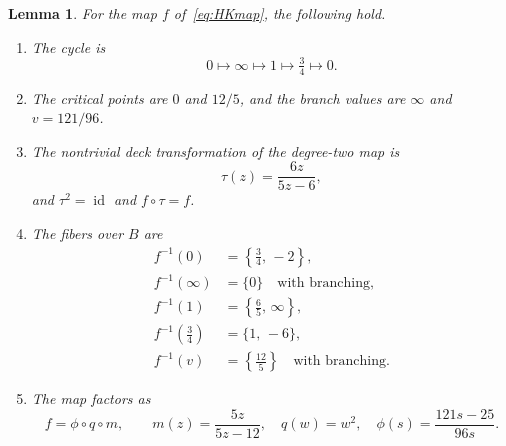 \documentclass[12pt]{article}
\newtheorem{lemma}[theorem]{Lemma}
\theoremstyle{definition}
\theoremstyle{remark}
\numberwithin{equation}{section}
\newcommand{\id}{\operatorname{id}}
\begin{document}
\begin{lemma}
\label{lem:HK-map}
For the map $f$ of~\eqref{eq:HKmap}, the following hold.
\begin{enumerate}[label=(\roman*)]
\item\label{it:hk-cycle} The cycle is
\[
0\longmapsto\infty\longmapsto1\longmapsto\tfrac34\longmapsto0.
\]
\item\label{it:hk-crit} The critical points are $0$ and $12/5$, and the
branch values are $\infty$ and $v=121/96$.
\item\label{it:hk-deck} The nontrivial deck transformation of the
degree-two map is
\[
\tau(z)=\frac{6z}{5z-6},
\]
and $\tau^{2}=\id$ and $f\circ\tau=f$.
\item\label{it:hk-fibers} The fibers over $B$ are
\[
\begin{aligned}
f^{-1}(0)&=\left\{\tfrac34,\,-2\right\},\\
f^{-1}(\infty)&=\{0\}\quad\text{with branching},\\
f^{-1}(1)&=\left\{\tfrac65,\,\infty\right\},\\
f^{-1}\!\left(\tfrac34\right)&=\{1,\,-6\},\\
f^{-1}(v)&=\left\{\tfrac{12}{5}\right\}\quad\text{with branching}.
\end{aligned}
\]
\item\label{it:hk-factor} The map factors as
\[
f=\phi\circ q\circ m,\qquad
m(z)=\frac{5z}{5z-12},\quad q(w)=w^{2},\quad
\phi(s)=\frac{121s-25}{96s}.
\]
\end{enumerate}
\end{lemma}
\end{document}
